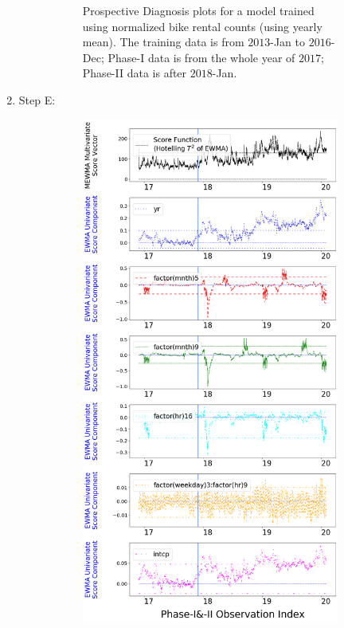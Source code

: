 \documentclass[twoside,11pt]{article}
\begin{document}
\begin{enumerate}
\begin{figure}[H]
\begin{subfigure}[t]{0.32\linewidth}
     \captionsetup{width=.95\linewidth}
     \caption{Prospective Diagnosis plots for a model trained using normalized bike rental counts (using yearly mean). The training data is from $2013$-Jan to $2016$-Dec; Phase-I data is from the whole year of $2017$; Phase-II data is after $2018$-Jan.}
     \label{fig:bs_raw_cnt_2}
\end{subfigure}
\caption{
}
\label{fig:bike_sharing_diag}
\end{figure}

\item Step E:

\begin{figure}[H]
\centering
    \begin{subfigure}[t]{0.32\linewidth}
     \centering
         \includegraphics[width=1.0\textwidth, trim=.0in .0in .0in .0in, clip]{../figures/v14/bike_sharing/reg_lin_E/neg_single_bike_fisher_mlines_with_regu_1e-08_0_0001_0_01_99_99.png}

\end{subfigure}
\end{figure}
\end{enumerate}
\end{document}
